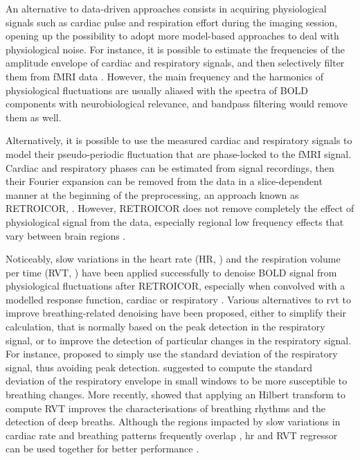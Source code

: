 An alternative to data-driven approaches consists in acquiring physiological
signals such as cardiac pulse and respiration effort during the imaging session,
opening up the possibility to adopt more model-based approaches to deal with
physiological noise. For instance, it is possible to estimate the frequencies of
the amplitude envelope of cardiac and respiratory signals, and then selectively
filter them from fMRI data \citep{Biswal1996Reductionphysiologicalfluctuations}.
However, the main frequency and the harmonics of physiological fluctuations are
usually aliased with the spectra of BOLD components with neurobiological
relevance, and bandpass filtering would remove them as well.

Alternatively, it is possible to use the measured cardiac and respiratory
signals to model their pseudo-periodic fluctuation that are phase-locked to the
fMRI signal. Cardiac and respiratory phases can be estimated from signal
recordings, then their Fourier expansion can be removed from the data in a
slice-dependent manner at the beginning of the preprocessing, an approach known
as RETROICOR, \cite{Glover2000Imagebasedmethod}. However, RETROICOR does not
remove completely the effect of physiological signal from the data, especially
regional low frequency effects that vary between brain regions
\citep{Birn2006Separatingrespiratoryvariation,Chang2009Influenceheartrate,Shmueli2007Lowfrequencyfluctuations}.

Noticeably, slow variations in the heart rate (HR,
\cite{Shmueli2007Lowfrequencyfluctuations}) and the respiration volume per time
(RVT, \cite{Birn2006Separatingrespiratoryvariation}) have been applied
successfully to denoise BOLD signal from physiological fluctuations after
RETROICOR, especially when convolved with a modelled response function, cardiac
\citep{Chang2009Influenceheartrate} or respiratory
\citep{Birn2008respirationresponsefunction}. Various alternatives to
\acrshort*{rvt} to improve breathing-related denoising have been proposed,
either to simplify their calculation, that is normally based on the peak
detection in the respiratory signal, or to improve the detection of particular
changes in the respiratory signal. For instance,
\cite{Chang2009Relationshiprespirationend} proposed to simply use the standard
deviation of the respiratory signal, thus avoiding peak detection.
\cite{Power2018RiddingfMRIdata} suggested to compute the standard deviation of
the respiratory envelope in small windows to be more susceptible to breathing
changes\cite{I think this is not the proper reference by Power for this method}.
More recently, \cite{Harrison2021Hilbertbasedmethod} showed that applying an
Hilbert transform to compute RVT improves the characterisations of breathing
rhythms and the detection of deep breaths. Although the regions impacted by slow
variations in cardiac rate and breathing patterns frequently overlap
\citep{Chang2009Influenceheartrate,Kassinopoulos2019Identificationphysiologicalresponse},
\acrshort*{hr} and RVT regressor can be used together for better performance
\citep{Chang2009Influenceheartrate}.

